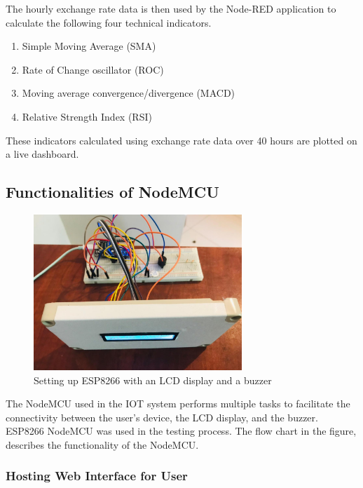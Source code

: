 The hourly exchange rate data is then used by the Node-RED application to calculate the following four technical indicators.\\

\begin{enumerate}[itemsep=-1.7mm]
\item Simple Moving Average (SMA)
\item Rate of Change oscillator (ROC)
\item Moving average convergence/divergence (MACD)
\item Relative Strength Index (RSI)
\end{enumerate}

These indicators calculated using exchange rate data over 40 hours are plotted on a live dashboard. 

\subsection{Functionalities of NodeMCU}

\begin{figure}[h]
    \centering
      \includegraphics[width=0.7\textwidth]{images/front.png}
    \caption{Setting up ESP8266 with an LCD display and a buzzer}
    \label{front}
\end{figure}

The NodeMCU used in the IOT system performs multiple tasks to facilitate the connectivity between the user’s device, the LCD display, and the buzzer. ESP8266 NodeMCU was used in the testing process. The flow chart in the figure, describes the functionality of the NodeMCU.


\subsubsection{Hosting Web Interface for User}

